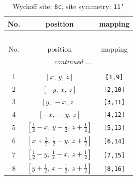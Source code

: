 \documentclass[fleqn,8pt]{jsarticle}
\begin{document}
\renewcommand{\arraystretch}{1.2}
\begin{longtable}{ccc}
\caption{Wyckoff site: {\tt 8c}, site symmetry: {\tt 11'}}
 \\
 \hline \hline
No. & position & mapping \\ \hline \endfirsthead

\multicolumn{2}{l}{\tablename\ \thetable{}} \\
 \hline \hline
No. & position & mapping \\ \hline \endhead

 \hline \hline
\multicolumn{2}{r}{\footnotesize\it continued ...} \\ \endfoot

 \hline \hline
\multicolumn{2}{r}{} \\ \endlastfoot

1 & $\left[ x,\, y,\, z \right]$ & {\tt [1,9]} \\ \hline
2 & $\left[ - y,\, x,\, z \right]$ & {\tt [2,10]} \\ \hline
3 & $\left[ y,\, - x,\, z \right]$ & {\tt [3,11]} \\ \hline
4 & $\left[ - x,\, - y,\, z \right]$ & {\tt [4,12]} \\ \hline
5 & $\left[ \frac{1}{2} - x,\, y + \frac{1}{2},\, z + \frac{1}{2} \right]$ & {\tt [5,13]} \\ \hline
6 & $\left[ x + \frac{1}{2},\, \frac{1}{2} - y,\, z + \frac{1}{2} \right]$ & {\tt [6,14]} \\ \hline
7 & $\left[ \frac{1}{2} - y,\, \frac{1}{2} - x,\, z + \frac{1}{2} \right]$ & {\tt [7,15]} \\ \hline
8 & $\left[ y + \frac{1}{2},\, x + \frac{1}{2},\, z + \frac{1}{2} \right]$ & {\tt [8,16]} \\
\end{longtable}
\end{document}

